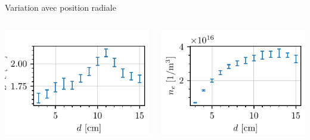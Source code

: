 \documentclass[10pt]{beamer}
\begin{document}
\begin{frame}{Variation avec position radiale}
    \begin{columns}
        \centering
        \includegraphics[scale=1]{../figures/temperatureeV_position_radial.pdf}

        \centering
        \includegraphics[scale=1]{../figures/density_position_radial.pdf}

    \end{columns}
\end{frame}
\end{document}
